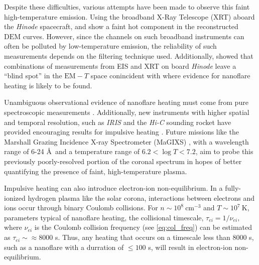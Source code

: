 \documentclass[tighten,apj]{emulateapj}
\newcommand{\ang}{\AA~}
\begin{document}
	\par Despite these difficulties, various attempts have been made to observe this faint high-temperature emission. Using the broadband X-Ray Telescope (XRT) aboard the \textit{Hinode} spacecraft, \citet{schmelz_hinode_2009} and \citet{reale_evidence_2009} show a faint hot component in the reconstructed $\mathrm{DEM}$ curves. However, since the channels on such broadband instruments can often be polluted by low-temperature emission, the reliability of such measurements depends on the filtering technique used. Additionally, \citet{winebarger_defining_2012} showed that combinations of measurements from EIS \citep{culhane_euv_2007} and XRT \citep{golub_x-ray_2007} on board \textit{Hinode} \citep{kosugi_hinode_2007} leave a ``blind spot'' in the $\mathrm{EM}-T$ space conincident with where evidence for nanoflare heating is likely to be found. 
	\par Unambiguous observational evidence of nanoflare heating must come from pure spectroscopic measurements \citep[see][]{brosius_pervasive_2014}. Additionally, new instruments with higher spatial and temporal resolution, such as \textit{IRIS} \citep{de_pontieu_interface_2014} and the \textit{Hi-C} sounding rocket \citep{cirtain_energy_2013} have provided encouraging results for impulsive heating \citep{testa_observing_2013,testa_evidence_2014}. Future missions like the Marshall Grazing Incidence X-ray Spectrometer (MaGIXS) \citep{kobayashi_marshall_2011,winebarger_new_2014}, with a wavelength range of 6-24 \ang and a temperature range of $6.2<\log{T}<7.2$, aim to probe this previously poorly-resolved portion of the coronal spectrum in hopes of better quantifying the presence of faint, high-temperature plasma.
	\par Impulsive heating can also introduce electron-ion non-equilibrium. In a fully-ionized hydrogen plasma like the solar corona, interactions between electrons and ions occur through binary Coulomb collisions. For $n\sim10^8~\mathrm{cm}^{-3}$ and $T\sim10^7~\mathrm{K}$, parameters typical of nanoflare heating, the collisional timescale, $\tau_{ei}=1/\nu_{ei}$, where $\nu_{ei}$ is the Coulomb collision frequency (see \autoref{eq:col_freq}) can be estimated as $\tau_{ei}\sim\approx8000$ s. Thus, any heating that occurs on a timescale less than 8000 s, such as a nanoflare with a durration of $\le100$ s, will result in electron-ion non-equilibrium. 
\end{document}
